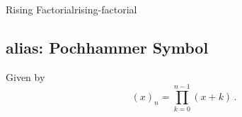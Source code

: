 \begin{definition}{Rising Factorial}{rising-factorial}
  \hypertarget{alias-pochhammer-symbol}{%
    \subsection{alias: Pochhammer Symbol}\label{alias-pochhammer-symbol}}

  Given by \[(x)_n = \prod_{k=0}^{n-1} (x+k)\,.\]
\end{definition}
